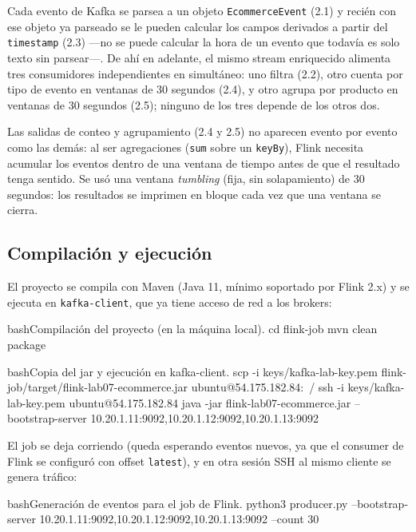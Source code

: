 		Cada evento de Kafka se parsea a un objeto \texttt{EcommerceEvent} (2.1) y recién con ese objeto ya parseado se le pueden calcular los campos derivados a partir del \texttt{timestamp} (2.3) —no se puede calcular la hora de un evento que todavía es solo texto sin parsear—. De ahí en adelante, el mismo stream enriquecido alimenta tres consumidores independientes en simultáneo: uno filtra (2.2), otro cuenta por tipo de evento en ventanas de 30 segundos (2.4), y otro agrupa por producto en ventanas de 30 segundos (2.5); ninguno de los tres depende de los otros dos.

		Las salidas de conteo y agrupamiento (2.4 y 2.5) no aparecen evento por evento como las demás: al ser agregaciones (\texttt{sum} sobre un \texttt{keyBy}), Flink necesita acumular los eventos dentro de una ventana de tiempo antes de que el resultado tenga sentido. Se usó una ventana \textit{tumbling} (fija, sin solapamiento) de 30 segundos: los resultados se imprimen en bloque cada vez que una ventana se cierra.

	\subsection{Compilación y ejecución}

		El proyecto se compila con Maven (Java 11, mínimo soportado por Flink 2.x) y se ejecuta en \texttt{kafka-client}, que ya tiene acceso de red a los brokers:

		\begin{sourcecode}[\label{codigo-flink-build}]{bash}{Compilación del proyecto (en la máquina local).}
cd flink-job
mvn clean package
		\end{sourcecode}

		\begin{sourcecode}[\label{codigo-flink-deploy}]{bash}{Copia del jar y ejecución en kafka-client.}
scp -i keys/kafka-lab-key.pem flink-job/target/flink-lab07-ecommerce.jar ubuntu@54.175.182.84:~/
ssh -i keys/kafka-lab-key.pem ubuntu@54.175.182.84
java -jar flink-lab07-ecommerce.jar --bootstrap-server 10.20.1.11:9092,10.20.1.12:9092,10.20.1.13:9092
		\end{sourcecode}

		El job se deja corriendo (queda esperando eventos nuevos, ya que el consumer de Flink se configuró con offset \texttt{latest}), y en otra sesión SSH al mismo cliente se genera tráfico:

		\begin{sourcecode}[\label{codigo-flink-producer}]{bash}{Generación de eventos para el job de Flink.}
python3 producer.py --bootstrap-server 10.20.1.11:9092,10.20.1.12:9092,10.20.1.13:9092 --count 30
		\end{sourcecode}

